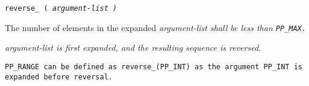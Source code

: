
\tt{reverse_ (} \it{argument-list} \tt{)}


The number of elements in the expanded
\it{argument-list} shall be less than \tt{PP_MAX}.


\it{argument-list} is first expanded, and the resulting sequence is reversed.

\example \tt{PP_RANGE} can be defined as \tt{reverse_(PP_INT)}
as the argument \tt{PP_INT} is expanded before reversal.
